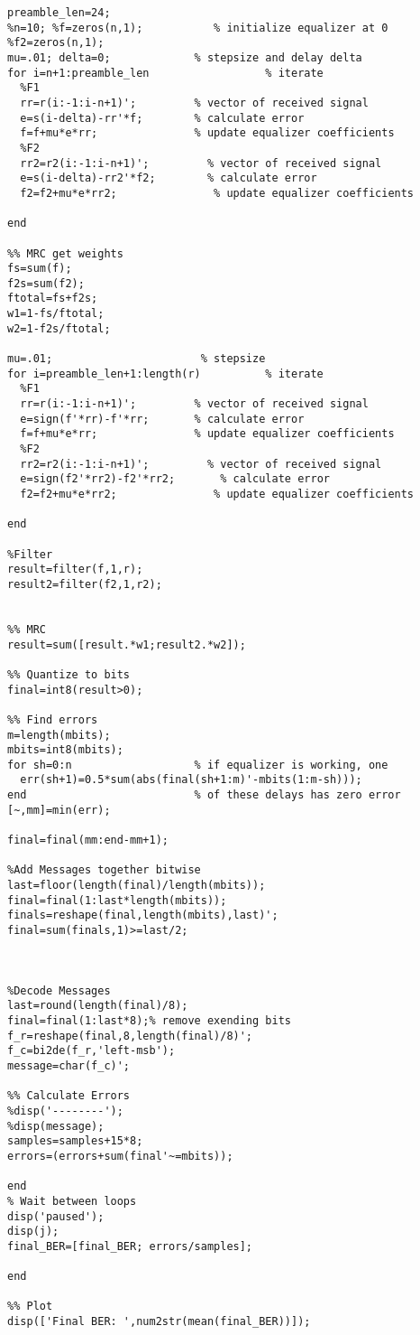 \begin{lstlisting}[breaklines]
%% Equalize
preamble_len=24;
%n=10; %f=zeros(n,1);           % initialize equalizer at 0
%f2=zeros(n,1);
mu=.01; delta=0;             % stepsize and delay delta
for i=n+1:preamble_len                  % iterate
  %F1
  rr=r(i:-1:i-n+1)';         % vector of received signal
  e=s(i-delta)-rr'*f;        % calculate error
  f=f+mu*e*rr;               % update equalizer coefficients
  %F2
  rr2=r2(i:-1:i-n+1)';         % vector of received signal
  e=s(i-delta)-rr2'*f2;        % calculate error
  f2=f2+mu*e*rr2;               % update equalizer coefficients

end

%% MRC get weights
fs=sum(f);
f2s=sum(f2);
ftotal=fs+f2s;
w1=1-fs/ftotal;
w2=1-f2s/ftotal;

mu=.01;                       % stepsize
for i=preamble_len+1:length(r)          % iterate
  %F1
  rr=r(i:-1:i-n+1)';         % vector of received signal
  e=sign(f'*rr)-f'*rr;       % calculate error
  f=f+mu*e*rr;               % update equalizer coefficients
  %F2
  rr2=r2(i:-1:i-n+1)';         % vector of received signal
  e=sign(f2'*rr2)-f2'*rr2;       % calculate error
  f2=f2+mu*e*rr2;               % update equalizer coefficients

end

%Filter
result=filter(f,1,r);
result2=filter(f2,1,r2);


%% MRC 
result=sum([result.*w1;result2.*w2]);

%% Quantize to bits
final=int8(result>0);

%% Find errors
m=length(mbits);
mbits=int8(mbits);
for sh=0:n                   % if equalizer is working, one
  err(sh+1)=0.5*sum(abs(final(sh+1:m)'-mbits(1:m-sh)));
end                          % of these delays has zero error
[~,mm]=min(err);

final=final(mm:end-mm+1);

%Add Messages together bitwise
last=floor(length(final)/length(mbits));
final=final(1:last*length(mbits));
finals=reshape(final,length(mbits),last)';
final=sum(finals,1)>=last/2;



%Decode Messages
last=round(length(final)/8);
final=final(1:last*8);% remove exending bits
f_r=reshape(final,8,length(final)/8)';
f_c=bi2de(f_r,'left-msb');
message=char(f_c)';

%% Calculate Errors
%disp('--------');
%disp(message); 
samples=samples+15*8;
errors=(errors+sum(final'~=mbits));

end
% Wait between loops
disp('paused');
disp(j);
final_BER=[final_BER; errors/samples];

end

%% Plot
disp(['Final BER: ',num2str(mean(final_BER))]);


\end{lstlisting}
